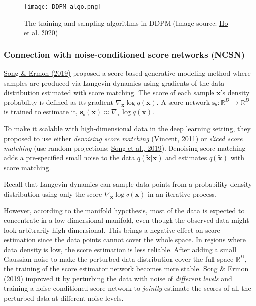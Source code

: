 \documentclass[12pt]{article}
\begin{document}
\begin{figure}[H]
    \centering
    \texttt{[image: DDPM-algo.png]}
    \caption{The training and sampling algorithms in DDPM (Image source: \href{https://arxiv.org/abs/2006.11239}{Ho et al. 2020})}
\end{figure}

\subsubsection*{Connection with noise-conditioned score networks (NCSN)}
\href{https://arxiv.org/abs/1907.05600}{Song \& Ermon (2019)} proposed a score-based generative modeling method where samples are produced via Langevin dynamics using gradients of the data distribution estimated with score matching. The score of each sample $\mathbf{x}$'s density probability is defined as its gradient $\nabla_{\mathbf{x}} \log q(\mathbf{x})$. A score network $\mathbf{s}_\theta: \mathbb{R}^D \to \mathbb{R}^D$ is trained to estimate it, $\mathbf{s}_\theta(\mathbf{x}) \approx \nabla_{\mathbf{x}} \log q(\mathbf{x})$.

To make it scalable with high-dimensional data in the deep learning setting, they proposed to use either \emph{denoising score matching} (\href{http://www.iro.umontreal.ca/~vincentp/Publications/smdae_techreport.pdf}{Vincent, 2011}) or \emph{sliced score matching} (use random projections; \href{https://arxiv.org/abs/1905.07088}{Song et al., 2019}). Denoising score matching adds a pre-specified small noise to the data $q(\tilde{\mathbf{x}} \vert \mathbf{x})$ and estimates $q(\tilde{\mathbf{x}})$ with score matching.

Recall that Langevin dynamics can sample data points from a probability density distribution using only the score $\nabla_{\mathbf{x}} \log q(\mathbf{x})$ in an iterative process.

However, according to the manifold hypothesis, most of the data is expected to concentrate in a low dimensional manifold, even though the observed data might look arbitrarily high-dimensional. This brings a negative effect on score estimation since the data points cannot cover the whole space. In regions where data density is low, the score estimation is less reliable. After adding a small Gaussian noise to make the perturbed data distribution cover the full space $\mathbb{R}^D$, the training of the score estimator network becomes more stable. \href{https://arxiv.org/abs/1907.05600}{Song \& Ermon (2019)} improved it by perturbing the data with noise of \emph{different levels} and training a noise-conditioned score network to \emph{jointly} estimate the scores of all the perturbed data at different noise levels.
\end{document}
